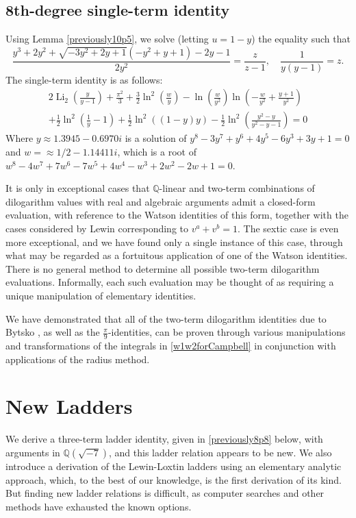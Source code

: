 \documentclass[12pt]{article}
\begin{document}
\subsection{8th-degree single-term identity}
 Using Lemma \ref{previously10p5}, we solve (letting $u=1-y$) the equality such that 
\begin{equation*}
 \frac{y^3 + 2 y^2 + \sqrt{-3 y^2 + 2 y + 1} (-y^2 + y + 1) - 2 y - 1}{2 y^2} = \frac{z}{z - 1}, \quad \frac{1}{y(y - 1)} = z. 
\end{equation*}
 The single-term identity is as follows:
\begin{equation*}
\begin{aligned}
2 \operatorname{Li}_2\left(\frac{y}{y - 1}\right)
+ \frac{\pi^2}{3}
+ \frac{3}{2} \ln^2\left(\frac{w}{y}\right)
- \ln\left(\frac{w}{y^2}\right) \ln\left(-\frac{w}{y^2} + \frac{y + 1}{y^2}\right)\\
+ \frac{1}{2} \ln^2\left(\frac{1}{y} - 1\right)
+ \frac{1}{2} \ln^2\left((1 - y) y\right)
- \frac{1}{2} \ln^2\left(\frac{y^2 - y}{y^2 - y - 1}\right) = 0
\end{aligned}
\end{equation*}
 Where $y\approx1.3945 - 0.6970 i$ is a solution of $y^8 - 3 y^7 + y^6 + 4 y^5 - 6 y^3 + 3 y + 
 1=0$ and $w=\approx 1/2 - 1.14411 i$, which is a root of $w^8 - 4w^7 + 7w^6 - 7w^5 + 4w^4 - 
 w^3 + 2w^2 - 2w + 1 = 0$.

 It is only in exceptional cases that $\mathbb{Q}$-linear and two-term combinations of dilogarithm values with real and algebraic 
 arguments admit a closed-form evaluation, with reference to the Watson identities of this form, together with the cases 
 considered by Lewin corresponding to $v^a+v^b=1$. The sextic case is even more exceptional, and we have found only a single 
 instance of this case, through what may be regarded as a fortuitous application of one of the Watson identities. There is no 
 general method to determine all possible two-term dilogarithm evaluations. Informally, each such evaluation may be thought of as 
 requiring a unique manipulation of elementary identities. 

 We have demonstrated that all of the two-term dilogarithm identities due to Bytsko \cite{Bytsko1999}, as well 
 as the $\frac{\pi}{9}$-identities, can be proven through various manipulations and transformations of the 
 integrals in \eqref{w1w2forCampbell} in conjunction with applications of the radius method. 

\section{New Ladders}
 We derive a three-term ladder identity, given in \eqref{previously8p8} below, with arguments in $\mathbb{Q}(\sqrt{-7})$, 
 and this ladder relation appears to be new. We also introduce a derivation of the Lewin-Loxtin ladders using an elementary 
 analytic approach, which, to the best of our knowledge, is the first derivation of its kind. But finding new ladder relations is difficult, as 
 computer searches and other methods have exhausted the known options. 
\end{document}

